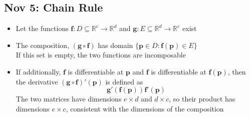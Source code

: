 \documentclass[10pt, oneside]{article}
\newcommand{\R}{\mathbb{R}}
\renewcommand{\vec}[1]{\mathbf{#1}}
\newcommand{\vecf}[1]{\boldsymbol{#1}}
\begin{document}
\subsection{Nov 5: Chain Rule}
\begin{itemize}
    \item Let the functions $\vecf{f} : D \subseteq \R^c \rightarrow \R^d$ and $\vecf{g} : E \subseteq \R^d \rightarrow \R^e$ exist
    \item The composition, $(\vecf{g} \circ \vecf{f})$ has domain $\{\vec{p} \in D : \vecf{f}(\vec{p}) \in E\}$\\
    If this set is empty, the two functions are incomposable
    \item If additionally, $\vecf{f}$ is differentiable at $\vec{p}$ and $\vecf{f}$ is differentiable at $\vecf{f}(\vec{p})$, then the derivative $(\vecf{g} \circ \vecf{f})'(\vec{p})$ is defined as
        \[\vecf{g}'(\vecf{f}(\vec{p}))\vecf{f}'(\vec{p})\]
    The two matrices have dimensions $e \times d$ and $d \times c$, so their product has dimensions $e \times c$, consistent with the dimensions of the composition
\end{itemize}
\end{document}
